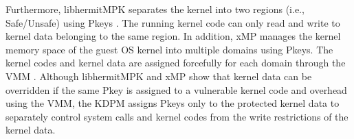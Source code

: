 Furthermore, libhermitMPK separates the kernel into two regions (i.e.,
Safe/Unsafe) using Pkeys \cite{libhermitmpk}.
The running kernel code can only read and write to kernel data belonging to the
same region.
%
In addition, xMP manages the kernel memory space of the guest OS kernel into
multiple domains using Pkeys. The kernel codes and kernel data are assigned
forcefully for each domain through the VMM \cite{xmp}.
Although libhermitMPK and xMP show that kernel data can be overridden if the
same Pkey is assigned to a vulnerable kernel code and overhead using
the VMM,
the KDPM assigns Pkeys only to the protected kernel data to separately control
system calls and kernel codes from the write restrictions of the kernel data.

